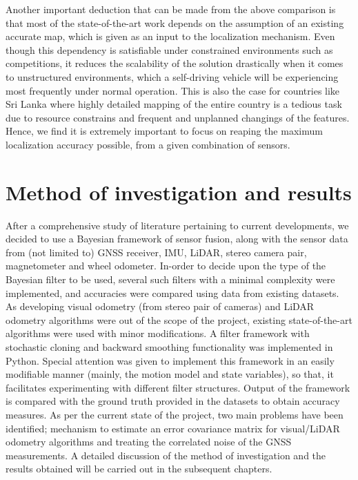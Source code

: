 Another important deduction that can be made from the above comparison is that most of the state-of-the-art work depends on the assumption of an existing accurate map, which is given as an input to the localization mechanism. Even though this dependency is satisfiable under constrained environments such as competitions, it reduces the scalability of the solution drastically when it comes to unstructured environments, which a self-driving vehicle will be experiencing most frequently under normal operation. This is also the case for countries like Sri Lanka where highly detailed mapping of the entire country is a tedious task due to resource constrains and frequent and unplanned changings of the features. Hence, we find it is extremely important to focus on reaping the maximum localization accuracy possible, from a given combination of sensors.





\section{Method of investigation and results}
After a comprehensive study of literature pertaining to current developments, we decided to use a Bayesian framework of sensor fusion, along with the sensor data from (not limited to) \gls{GNSS} receiver, \gls{IMU}, \gls{LiDAR}, stereo camera pair, magnetometer and wheel odometer. In-order to decide upon the type of the Bayesian filter to be used, several such filters with a minimal complexity were implemented, and accuracies were compared using data from existing datasets. As developing visual odometry (from stereo pair of cameras) and \gls{LiDAR} odometry algorithms were out of the scope of the project, existing state-of-the-art algorithms were used with minor modifications. A filter framework with stochastic cloning and backward smoothing functionality was implemented in Python. Special attention was given to implement this framework in an easily modifiable manner (mainly, the motion model and state variables), so that, it facilitates experimenting with different filter structures. Output of the framework is compared with the ground truth provided in the datasets to obtain accuracy measures. As per the current state of the project, two main problems have been identified; mechanism to estimate an error covariance matrix for visual/\gls{LiDAR} odometry algorithms and treating the correlated noise of the \gls{GNSS} measurements. A detailed discussion of the method of investigation and the results obtained will be carried out in the subsequent chapters.